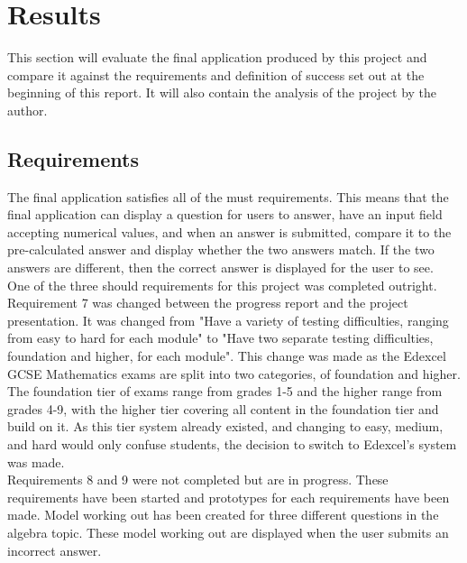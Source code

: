 \documentclass{article}
\begin{document}


\section{Results}
\label{section:results}

This section will evaluate the final application produced by this project and compare it against the requirements and definition of success set out at the beginning of this report. It will also contain the analysis of the project by the author. 

\subsection{Requirements}

The final application satisfies all of the must requirements. This means that the final application can display a question for users to answer, have an input field accepting numerical values, and when an answer is submitted, compare it to the pre-calculated answer and display whether the two answers match. If the two answers are different, then the correct answer is displayed for the user to see. \\

One of the three should requirements for this project was completed outright. Requirement 7 was changed between the progress report and the project presentation. It was changed from "Have a variety of testing difficulties, ranging from easy to hard for each module" to "Have two separate testing difficulties, foundation and higher, for each module". This change was made as the Edexcel GCSE Mathematics exams are split into two categories, of foundation and higher. The foundation tier of exams range from grades 1-5 and the higher range from grades 4-9, with the higher tier covering all content in the foundation tier and build on it. As this tier system already existed, and changing to easy, medium, and hard would only confuse students, the decision to switch to Edexcel's system was made. \\

Requirements 8 and 9 were not completed but are in progress. These requirements have been started and prototypes for each requirements have been made. Model working out has been created for three different questions in the algebra topic. These model working out are displayed when the user submits an incorrect answer. \\
\end{document}
